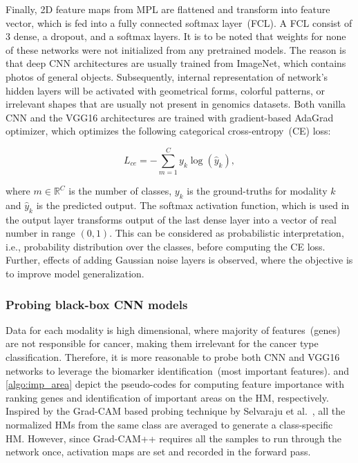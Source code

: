 \hspace*{3.5mm} Finally, 2D feature maps from MPL are flattened and transform into feature vector, which is fed into a fully connected softmax layer~(FCL). A FCL consist of 3 dense, a dropout, and a softmax layers. It is to be noted that weights for none of these networks were not initialized from any pretrained models. The reason is that deep CNN architectures are usually trained from ImageNet, which contains photos of general objects. Subsequently, internal representation of network's hidden layers will be activated with geometrical forms, colorful patterns, or irrelevant shapes that are usually not present in genomics datasets. Both vanilla CNN and the VGG16 architectures are trained with gradient-based AdaGrad optimizer, which optimizes the following categorical cross-entropy~(CE) loss: 

\begin{equation} 
    L_{ce}=-\sum_{m=1}^{C} y_{k} \log \left(\hat{y}_{k}\right) \label{eq:ce_loss_function},
\end{equation} 

\hspace*{3.5mm} where $m \in \mathbb{R}^{C}$ is the number of classes, $y_{k}$ is the ground-truths for modality $k$ and $\hat{y}_{k}$ is the predicted output. The softmax activation function, which is used in the output layer transforms output of the last dense layer into a vector of real number in range $\left(0,1\right)$. This can be considered as probabilistic interpretation, i.e., probability distribution over the classes, before computing the CE loss. Further, effects of adding Gaussian noise layers is observed, where the objective is to improve model generalization. 


\subsubsection{Probing black-box CNN models}
Data for each modality is high dimensional, where majority of features~(genes) are not responsible for cancer, making them irrelevant for the cancer type classification. Therefore, it is more reasonable to probe both CNN and VGG16 networks to leverage the biomarker identification~(most important features).  and \ref{algo:imp_area} depict the pseudo-codes for computing feature importance with ranking genes and identification of important areas on the HM, respectively. Inspired by the Grad-CAM based probing technique by Selvaraju et al.~\cite{mostavi2019convolutional}, all the normalized HMs from the same class are averaged to generate a class-specific HM. However, since Grad-CAM++ requires all the samples to run through the network once, activation maps are set and recorded in the forward pass. 

